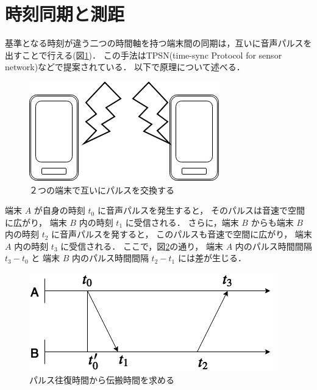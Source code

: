 

\section{時刻同期と測距}

基準となる時刻が違う二つの時間軸を持つ端末間の同期は，互いに音声パルスを出すことで行える(図\ref{fig:beeptobeep})．
この手法はTPSN(time-sync Protocol for sensor network)\cite{tpsn}などで提案されている．
以下で原理について述べる．

\begin{figure}[p]\centering
  \hspace{-2mm}\includegraphics[clip,width=1.1\hsize]{img/beeptobeep.png}
  \caption{２つの端末で互いにパルスを交換する}\label{fig:beeptobeep}
\end{figure}



端末 $A$ が自身の時刻 $t_0$ に音声パルスを発生すると，
そのパルスは音速で空間に広がり，
端末 $B$ 内の時刻 $t_1$ に受信される．
さらに，端末 $B$ からも端末 $B$ 内の時刻 $t_2$ に音声パルスを発すると，
このパルスも音速で空間に広がり，
端末 $A$ 内の時刻 $t_3$ に受信される．
ここで，図\ref{fig:clocksynchronization}の通り，
端末 $A$ 内のパルス時間間隔 $t_3-t_0$ と
端末 $B$ 内のパルス時間間隔 $t_2-t_1$ には差が生じる．

\begin{figure}[p]\centering
  \hspace{-2mm}\includegraphics[clip,width=1.1\hsize]{img/clock_synchronization.png}
  \caption{パルス往復時間から伝搬時間を求める}\label{fig:clocksynchronization}
\end{figure}

